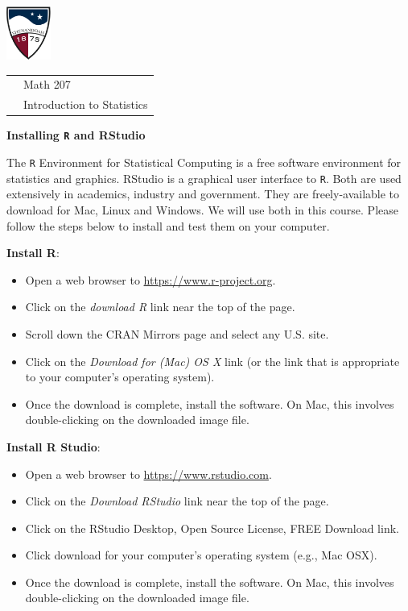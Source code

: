 \documentclass[10pt]{article}
\begin{document}
\vfill
\eject


\href{http://www.su.edu}{\includegraphics[height=1.75cm]{sulogo.eps}}
\vspace{-1.69cm}

{\small \hfill
\begin{tabular}{cl}
& Math 207\\
& Introduction to Statistics\\
\end{tabular}
}


\begin{center}
\textbf{\large  Installing \texttt{R} and RStudio}
\end{center}
\medskip

The \texttt{R} Environment for Statistical Computing 
 is a free software environment for statistics and graphics.
RStudio is a graphical user interface to \texttt{R}.  
Both are used extensively in academics, industry and government.
They are freely-available to download for Mac, Linux and Windows.
We will use both in this course.  Please follow the steps below
to install and test them on your computer.
\medskip


\textbf{Install R}:

\begin{itemize}
\item Open a web browser to \href{https://www.r-project.org}{https://www.r-project.org}.
\item Click on the \textit{download R} link near the top of the page.
\item Scroll down the CRAN Mirrors page and select any U.S. site.
\item Click on 
   the \textit{Download for (Mac) OS X} link (or the link that is
   appropriate to your computer's operating system).
\item Once the download is complete, install the software.  On Mac, this involves
  double-clicking on the downloaded image file.
\end{itemize}
\medskip


\textbf{Install R Studio}:
\begin{itemize}
\item Open a web browser to \href{https://www.rstudio.com}{https://www.rstudio.com}.
\item Click on the \textit{Download RStudio} link near the top of the page.
\item Click on the RStudio Desktop, Open Source License, FREE Download link.
\item Click download for your computer's operating system (e.g., Mac OSX).
\item Once the download is complete, install the software.  On Mac, this involves
  double-clicking on the downloaded image file.
\end{itemize}
\medskip
\end{document}
